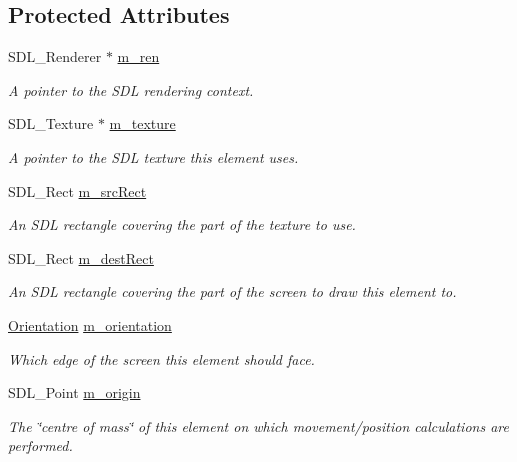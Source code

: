 \subsection*{Protected Attributes}
\begin{DoxyCompactItemize}
\item 
S\-D\-L\-\_\-\-Renderer $\ast$ \hyperlink{classGUI_1_1Element_a32340ae04789b6ea8037fdb1fb440ae1}{m\-\_\-ren}
\begin{DoxyCompactList}\small\item\em A pointer to the S\-D\-L rendering context. \end{DoxyCompactList}\item 
S\-D\-L\-\_\-\-Texture $\ast$ \hyperlink{classGUI_1_1Element_a2e63212ae641d8af447d62ede6c2c831}{m\-\_\-texture}
\begin{DoxyCompactList}\small\item\em A pointer to the S\-D\-L texture this element uses. \end{DoxyCompactList}\item 
S\-D\-L\-\_\-\-Rect \hyperlink{classGUI_1_1Element_a7a4a307f67ce1e23f313791ba032dc77}{m\-\_\-src\-Rect}
\begin{DoxyCompactList}\small\item\em An S\-D\-L rectangle covering the part of the texture to use. \end{DoxyCompactList}\item 
S\-D\-L\-\_\-\-Rect \hyperlink{classGUI_1_1Element_a999f0693d9a2205ef0c4aebd3771e7c8}{m\-\_\-dest\-Rect}
\begin{DoxyCompactList}\small\item\em An S\-D\-L rectangle covering the part of the screen to draw this element to. \end{DoxyCompactList}\item 
\hyperlink{namespaceGUI_a1a3a8094d47f7be06ce123fab38abf6a}{Orientation} \hyperlink{classGUI_1_1Element_a7c189466d4d240eb13aa461887a70142}{m\-\_\-orientation}
\begin{DoxyCompactList}\small\item\em Which edge of the screen this element should face. \end{DoxyCompactList}\item 
S\-D\-L\-\_\-\-Point \hyperlink{classGUI_1_1Element_a7661fce6fff7da3d308cdb604f7a417a}{m\-\_\-origin}
\begin{DoxyCompactList}\small\item\em The \char`\"{}centre of mass\char`\"{} of this element on which movement/position calculations are performed. \end{DoxyCompactList}\item 

\end{DoxyCompactItemize}
